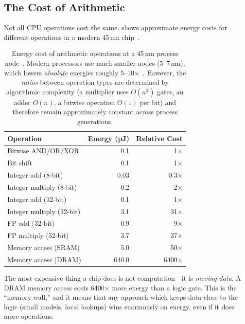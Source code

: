 \subsection{The Cost of Arithmetic}
\label{sec:cost-arithmetic}

Not all CPU operations cost the same.  shows
approximate energy costs for different operations in a modern 45\,nm
chip~\cite{horowitz2014energy}.

\begin{table}[htbp]
\centering
\caption{Energy cost of arithmetic operations at a 45\,nm process
  node~\cite{horowitz2014energy}. Modern processors use much smaller
  nodes (5--7\,nm), which lowers \emph{absolute} energies roughly
  5--10$\times$~\cite{stillmaker2017scaling}. However, the \emph{ratios}
  between operation types are determined by algorithmic complexity (a
  multiplier uses $O(n^2)$ gates, an adder $O(n)$, a bitwise operation
  $O(1)$ per bit) and therefore remain approximately constant across
  process generations.}
\label{tab:op-cost}
\begin{tabular}{@{}lrr@{}}
  \toprule
  \textbf{Operation}      & \textbf{Energy (pJ)} & \textbf{Relative Cost} \\
  \midrule
  Bitwise AND/OR/XOR      & 0.1                  & 1$\times$ \\
  Bit shift                & 0.1                  & 1$\times$ \\
  Integer add (8-bit)      & 0.03                 & 0.3$\times$ \\
  Integer multiply (8-bit) & 0.2                  & 2$\times$ \\
  Integer add (32-bit)     & 0.1                  & 1$\times$ \\
  Integer multiply (32-bit)& 3.1                  & 31$\times$ \\
  FP add (32-bit)          & 0.9                  & 9$\times$ \\
  FP multiply (32-bit)     & 3.7                  & 37$\times$ \\
  Memory access (SRAM)     & 5.0                  & 50$\times$ \\
  Memory access (DRAM)     & 640.0                & 6400$\times$ \\
  \bottomrule
\end{tabular}
\end{table}

\begin{keyinsight}
The most expensive thing a chip does is not computation---it is
\emph{moving data}. A DRAM memory access costs 6400$\times$ more
energy than a logic gate. This is the ``memory wall,'' and it means
that any approach which keeps data close to the logic (small models,
local lookups) wins enormously on energy, even if it does more
operations.
\end{keyinsight}

